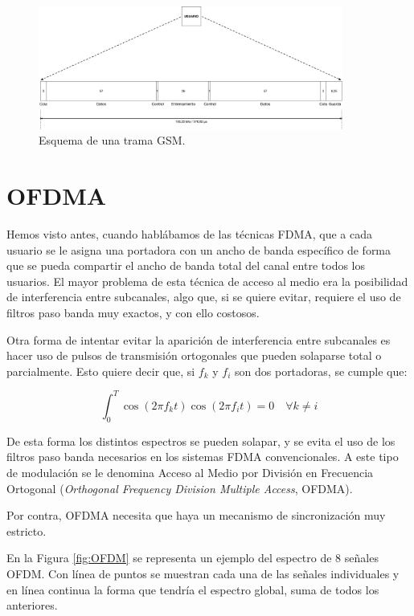 \documentclass[es,apuntes]{uah}
\begin{document}
 \begin{figure}[h!]
	\centering\includegraphics[width=10cm]{./Figuras/TramaGSM}
	\caption{Esquema de una trama GSM.}
	\label{fig:TramaGSM}
\end{figure}
 
\section{OFDMA}

Hemos visto antes, cuando hablábamos de las técnicas FDMA, que a cada usuario se le asigna una portadora con un ancho de banda específico de forma que se pueda compartir el ancho de banda total del canal entre todos los usuarios. El mayor problema de esta técnica de acceso al medio era la posibilidad de interferencia entre subcanales, algo que, si se quiere evitar, requiere el uso de filtros paso banda muy exactos, y con ello costosos. 

Otra forma de intentar evitar la aparición de interferencia entre subcanales es hacer uso de pulsos de transmisión ortogonales que pueden solaparse total o parcialmente. Esto quiere decir que, si $f_k$ y $f_i$ son dos portadoras, se cumple que:

\begin{displaymath}
	\int_0^T \cos (2 \pi f_k t) \cos (2 \pi f_i t) = 0 \quad \forall k \neq i
\end{displaymath}

 De esta forma los distintos espectros se pueden solapar, y se evita el uso de los filtros paso banda necesarios en los sistemas FDMA convencionales. A este tipo de modulación se le denomina Acceso al Medio por División en Frecuencia Ortogonal (\emph{Orthogonal Frequency Division Multiple Access}, OFDMA).
 
 Por contra, OFDMA necesita que haya un mecanismo de sincronización muy estricto.
 
 En la Figura \ref{fig:OFDM} se representa un ejemplo del espectro de 8 señales OFDM. Con línea de puntos se muestran cada una de las señales individuales y en línea continua la forma que tendría el espectro global, suma de todos los anteriores.
\end{document}
